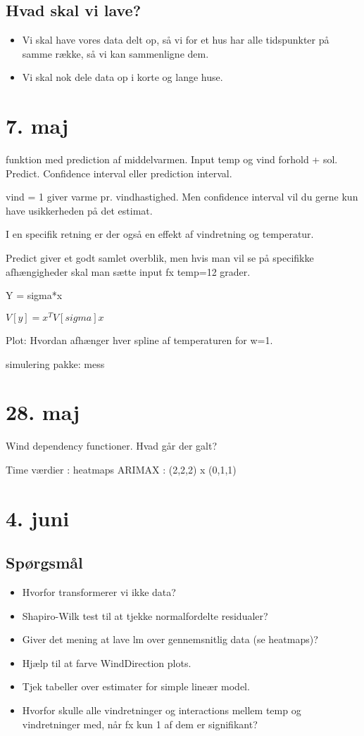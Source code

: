 \subsection{Hvad skal vi lave?}
\begin{itemize}
    \item Vi skal have vores data delt op, så vi for et hus har alle tidspunkter på samme række, så vi kan sammenligne dem.
    \item Vi skal nok dele data op i korte og lange huse.  
\end{itemize}


\section{7. maj}

funktion med prediction af middelvarmen. Input temp og vind forhold + sol.
Predict. Confidence interval eller prediction interval.

vind = 1 giver varme pr. vindhastighed. Men confidence interval vil du gerne kun have usikkerheden på det estimat.

I en specifik retning er der også en effekt af vindretning og temperatur.


Predict giver et godt samlet overblik, men hvis man vil se på specifikke afhængigheder skal man sætte input fx temp=12 grader.


Y = sigma*x

$V[y] = x^T V[sigma] x$


Plot: Hvordan afhænger hver spline af temperaturen for w=1.



simulering pakke:
mess


\section{28. maj}
Wind dependency functioner. Hvad går der galt?

Time værdier : heatmaps
ARIMAX : (2,2,2) x (0,1,1)

\pagebreak

\section{4. juni}

\subsection{Spørgsmål}
\begin{itemize}
    \item Hvorfor transformerer vi ikke data? 
    \item Shapiro-Wilk test til at tjekke normalfordelte residualer? 
    \item Giver det mening at lave lm over gennemsnitlig data (se heatmaps)?
    \item Hjælp til at farve WindDirection plots.
    \item Tjek tabeller over estimater for simple lineær model. 
    \item Hvorfor skulle alle vindretninger og interactions mellem temp og vindretninger med, når fx kun 1 af dem er signifikant?
\end{itemize}